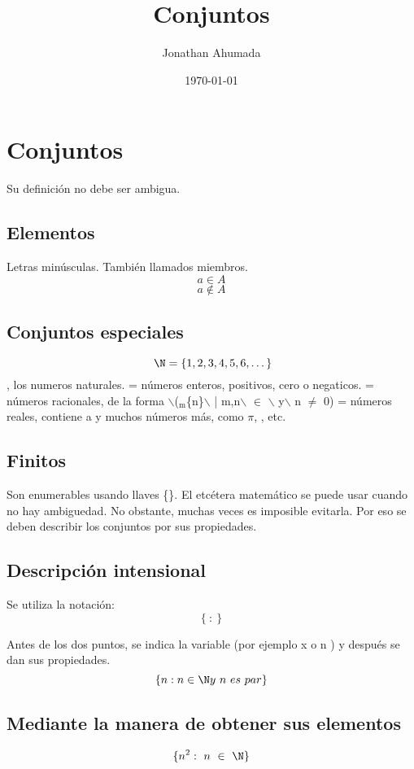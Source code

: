 \documentclass[11pt]{article}
\author{Jonathan Ahumada}
\date{\today}
\title{Conjuntos}
\begin{document}
\maketitle
\tableofcontents

\section{Conjuntos}
\label{sec-1}
Su definición no debe ser ambigua.
\subsection{Elementos}
\label{sec-1-1}
Letras minúsculas. También llamados miembros.
\[ a \in A\]
\[ a \notin A\]
\subsection{Conjuntos especiales}
\label{sec-1-2}
\[ \N = \{1,2,3,4,5,6, \dots{}\} \], los numeros naturales.
\Z = números enteros, positivos, cero o negaticos.
\Q = números racionales, de la forma $\backslash$(\frac$_{\text{m}}$\{n\}$\backslash$ | m,n$\backslash$ $\in$ \Z$\backslash$ y$\backslash$ n $\neq$ 0)
\R =  números reales, contiene a \Q y muchos números más, como $\pi$, , etc.

\subsection{Finitos}
\label{sec-1-3}
Son enumerables usando llaves \{\}. El etcétera matemático se puede 
usar cuando no hay ambiguedad. No obstante, muchas veces es imposible evitarla.
Por eso se deben describir los conjuntos por sus propiedades. 

\subsection{Descripción intensional}
\label{sec-1-4}
Se utiliza la notación:
\[\{\  :\ \} \]

Antes de los dos puntos, se indica la variable (por ejemplo x o n ) y después 
se dan sus propiedades. 
\[\{n : n \in \N y\ n\ es\ par\}\]

\subsection{Mediante la manera de obtener sus elementos}
\label{sec-1-5}

\[\{ n^2:\ n\ \in\ \N\}\]
\end{document}
